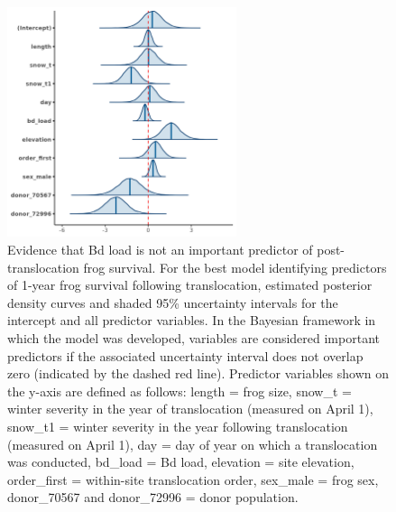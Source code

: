 \documentclass[9pt,twoside,lineno]{pnas-new}
\begin{document}
\begin{figure}

{\centering \includegraphics[width=0.60\textwidth]{figures/mcmc_areas_m1d.png}

}

\caption{\label{fig-survival-postdens}Evidence that Bd load is not an
important predictor of post-translocation frog survival. For the best
model identifying predictors of 1-year frog survival following
translocation, estimated posterior density curves and shaded 95\%
uncertainty intervals for the intercept and all predictor variables. In
the Bayesian framework in which the model was developed, variables are
considered important predictors if the associated uncertainty interval
does not overlap zero (indicated by the dashed red line). Predictor
variables shown on the y-axis are defined as follows: length = frog
size, snow\_t = winter severity in the year of translocation (measured
on April 1), snow\_t1 = winter severity in the year following
translocation (measured on April 1), day = day of year on which a
translocation was conducted, bd\_load = Bd load, elevation = site
elevation, order\_first = within-site translocation order, sex\_male =
frog sex, donor\_70567 and donor\_72996 = donor population.}

\end{figure}\clearpage
\end{document}
